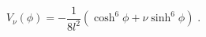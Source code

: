 \begin{equation}
V_{\nu }(\phi )=-\frac{1}{8l^{2}}\left( \cosh ^{6}\phi +\nu \sinh ^{6}\phi
\right) \;.  \label{The Potential}
\end{equation}

